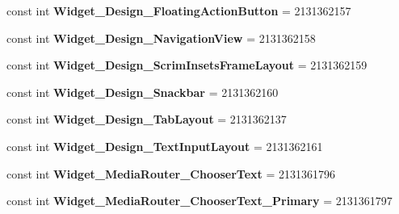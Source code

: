 \begin{DoxyCompactItemize}
const int {\bfseries Widget\+\_\+\+Design\+\_\+\+Floating\+Action\+Button} = 2131362157
\item 
\mbox{\label{class_pinned_app_1_1_droid_1_1_resource_1_1_style_a98eefa243a624e1b5cc27a53d8f49fcd}} 
const int {\bfseries Widget\+\_\+\+Design\+\_\+\+Navigation\+View} = 2131362158
\item 
\mbox{\label{class_pinned_app_1_1_droid_1_1_resource_1_1_style_aa9ad1484f619938921d8651e01edcf49}} 
const int {\bfseries Widget\+\_\+\+Design\+\_\+\+Scrim\+Insets\+Frame\+Layout} = 2131362159
\item 
\mbox{\label{class_pinned_app_1_1_droid_1_1_resource_1_1_style_acfe397e0430a159561a45a04660a7517}} 
const int {\bfseries Widget\+\_\+\+Design\+\_\+\+Snackbar} = 2131362160
\item 
\mbox{\label{class_pinned_app_1_1_droid_1_1_resource_1_1_style_aeb7a0c0391324d813ca25490ef34e2ab}} 
const int {\bfseries Widget\+\_\+\+Design\+\_\+\+Tab\+Layout} = 2131362137
\item 
\mbox{\label{class_pinned_app_1_1_droid_1_1_resource_1_1_style_a56bb7c223f58b0b6c69bb5bf6c85adc2}} 
const int {\bfseries Widget\+\_\+\+Design\+\_\+\+Text\+Input\+Layout} = 2131362161
\item 
\mbox{\label{class_pinned_app_1_1_droid_1_1_resource_1_1_style_a483274da8ed616be5d6d679665553b68}} 
const int {\bfseries Widget\+\_\+\+Media\+Router\+\_\+\+Chooser\+Text} = 2131361796
\item 
\mbox{\label{class_pinned_app_1_1_droid_1_1_resource_1_1_style_a08afb99264110f24e935c4a969454369}} 
const int {\bfseries Widget\+\_\+\+Media\+Router\+\_\+\+Chooser\+Text\+\_\+\+Primary} = 2131361797
\item 
\mbox{\label{class_pinned_app_1_1_droid_1_1_resource_1_1_style_a1d86e9fc4ab4450d4605fb7ae0d5b978}} 

\end{DoxyCompactItemize}
